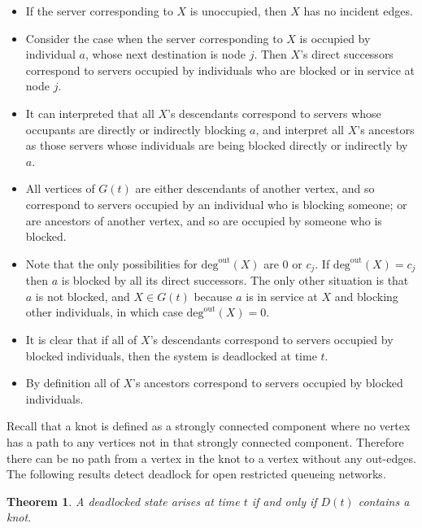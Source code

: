 \documentclass{article}
\newtheorem{theorem}{Theorem}
\numberwithin{equation}{section}
\begin{document}
\begin{itemize}

  \item If the server corresponding to $X$ is unoccupied, then $X$ has no incident edges.
  \item Consider the case when the server corresponding to $X$ is occupied by individual $a$, whose next destination is node $j$. Then $X$'s direct successors correspond to servers occupied by individuals who are blocked or in service at node $j$.
  \item It can interpreted that all $X$'s descendants correspond to servers whose occupants are directly or indirectly blocking $a$, and interpret all $X$'s ancestors as those servers whose individuals are being blocked directly or indirectly by $a$.
  \item All vertices of $G(t)$ are either descendants of another vertex, and so correspond to servers occupied by an individual who is blocking someone; or are ancestors of another vertex, and so are occupied by someone who is blocked.
  \item Note that the only possibilities for $\text{deg}^{\text{out}}(X)$ are 0 or $c_j$. If $\text{deg}^{\text{out}}(X) = c_j$ then $a$ is blocked by all its direct successors. The only other situation is that $a$ is not blocked, and $X \in G(t)$ because $a$ is in service at $X$ and blocking other individuals, in which case $\text{deg}^{\text{out}}(X) = 0$.
  \item It is clear that if all of $X$'s descendants correspond to servers occupied by blocked individuals, then the system is deadlocked at time $t$.
  \item By definition all of $X$'s ancestors correspond to servers occupied by blocked individuals.

\end{itemize}

Recall that a knot is defined as a strongly connected component where no vertex has a path to any vertices not in that strongly connected component.
Therefore there can be no path from a vertex in the knot to a vertex without any out-edges.
The following results detect deadlock for open restricted queueing networks.


\begin{theorem}\label{thrm:knot}
A deadlocked state arises at time $t$ if and only if $D(t)$ contains a knot.
\end{theorem}
\end{document}
